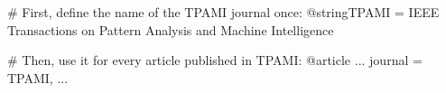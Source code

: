 # First, define the name of the TPAMI journal once:
@string{TPAMI = {IEEE Transactions on Pattern Analysis
                 and Machine Intelligence}}
                 
# Then, use it for every article published in TPAMI:
@article{
  ...
  journal = TPAMI,
  ...
}
